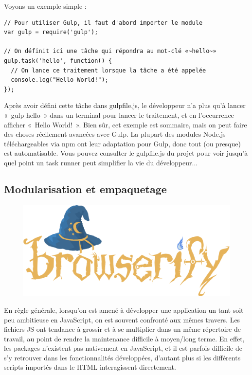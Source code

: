 \documentclass[a4paper,12pt]{article}
\begin{document}
Voyons un exemple simple :

\begin{lstlisting}
// Pour utiliser Gulp, il faut d'abord importer le module
var gulp = require('gulp');

// On définit ici une tâche qui répondra au mot-clé «~hello~»
gulp.task('hello', function() {
  // On lance ce traitement lorsque la tâche a été appelée
  console.log("Hello World!");
});
\end{lstlisting}

Après avoir défini cette tâche dans gulpfile.js, le développeur n'a plus qu'à lancer «~gulp hello~» dans un terminal pour lancer le traitement, et en l'occurrence afficher «~Hello World!~». Bien sûr, cet exemple est sommaire, mais on peut faire des choses réellement avancées avec Gulp. La plupart des modules Node.js téléchargeables via npm ont leur adaptation pour Gulp, donc tout (ou presque) est automatisable. Vous pouvez consulter le gulpfile.js du projet pour voir jusqu'à quel point un task runner peut simplifier la vie du développeur...

\subsection{Modularisation et empaquetage}

\begin{figure}[!h]
  \begin{center}
    \includegraphics[scale=0.7]{logo-browserify.png}
  \end{center}
\end{figure}

En règle générale, lorsqu'on est amené à développer une application un tant soit peu ambitieuse en JavaScript, on est souvent confronté aux mêmes travers. Les fichiers JS ont tendance à grossir et à se multiplier dans un même répertoire de travail, au point de rendre la maintenance difficile à moyen/long terme. En effet, les packages n'existent pas nativement en JavaScript, et il est parfois difficile de s'y retrouver dans les fonctionnalités développées, d'autant plus si les différents scripts importés dans le HTML interagissent directement.
\end{document}

